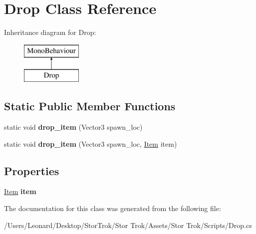 \hypertarget{class_drop}{}\section{Drop Class Reference}
\label{class_drop}
Inheritance diagram for Drop\+:\begin{figure}[H]
\begin{center}
\leavevmode
\includegraphics[height=2.000000cm]{class_drop}
\end{center}
\end{figure}
\subsection*{Static Public Member Functions}
\begin{DoxyCompactItemize}
\item 
\mbox{\label{class_drop_a14fe640c538e6222553a62fcffc3a5b5}} 
static void {\bfseries drop\+\_\+item} (Vector3 spawn\+\_\+loc)
\item 
\mbox{\label{class_drop_a54be66c04e5bc3cf54e5e1d66f5c819f}} 
static void {\bfseries drop\+\_\+item} (Vector3 spawn\+\_\+loc, \hyperlink{class_item}{Item} item)
\end{DoxyCompactItemize}
\subsection*{Properties}
\begin{DoxyCompactItemize}
\item 
\mbox{\label{class_drop_a05a88f2eb8504a72d7f0ff27bec854b7}} 
\hyperlink{class_item}{Item} {\bfseries item}
\end{DoxyCompactItemize}


The documentation for this class was generated from the following file\+:\begin{DoxyCompactItemize}
\item 
/\+Users/\+Leonard/\+Desktop/\+Stor\+Trok/\+Stor Trok/\+Assets/\+Stor Trok/\+Scripts/Drop.\+cs\end{DoxyCompactItemize}
